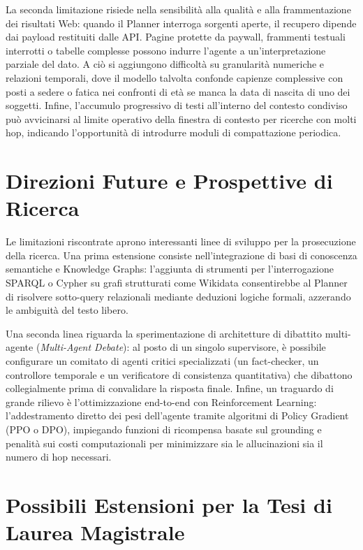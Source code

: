 La seconda limitazione risiede nella sensibilità alla qualità e alla frammentazione dei risultati Web: quando il Planner interroga sorgenti aperte, il recupero dipende dai payload restituiti dalle API. Pagine protette da paywall, frammenti testuali interrotti o tabelle complesse possono indurre l'agente a un'interpretazione parziale del dato. A ciò si aggiungono difficoltà su granularità numeriche e relazioni temporali, dove il modello talvolta confonde capienze complessive con posti a sedere o fatica nei confronti di età se manca la data di nascita di uno dei soggetti. Infine, l'accumulo progressivo di testi all'interno del contesto condiviso può avvicinarsi al limite operativo della finestra di contesto per ricerche con molti hop, indicando l'opportunità di introdurre moduli di compattazione periodica.

\section{Direzioni Future e Prospettive di Ricerca}
\label{sec:sviluppi_futuri}

Le limitazioni riscontrate aprono interessanti linee di sviluppo per la prosecuzione della ricerca. Una prima estensione consiste nell'integrazione di basi di conoscenza semantiche e Knowledge Graphs: l'aggiunta di strumenti per l'interrogazione SPARQL o Cypher su grafi strutturati come Wikidata consentirebbe al Planner di risolvere sotto-query relazionali mediante deduzioni logiche formali, azzerando le ambiguità del testo libero. 

Una seconda linea riguarda la sperimentazione di architetture di dibattito multi-agente (\textit{Multi-Agent Debate}): al posto di un singolo supervisore, è possibile configurare un comitato di agenti critici specializzati (un fact-checker, un controllore temporale e un verificatore di consistenza quantitativa) che dibattono collegialmente prima di convalidare la risposta finale. Infine, un traguardo di grande rilievo è l'ottimizzazione end-to-end con Reinforcement Learning: l'addestramento diretto dei pesi dell'agente tramite algoritmi di Policy Gradient (PPO o DPO), impiegando funzioni di ricompensa basate sul grounding e penalità sui costi computazionali per minimizzare sia le allucinazioni sia il numero di hop necessari.

\section{Possibili Estensioni per la Tesi di Laurea Magistrale}
\label{sec:estensioni_tesi}

